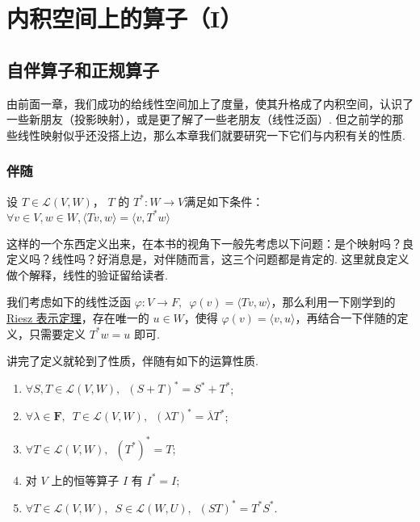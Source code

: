 \chapter{内积空间上的算子（I）}

\section{自伴算子和正规算子}

由前面一章，我们成功的给线性空间加上了度量，使其升格成了内积空间，认识了一些新朋友（投影映射），或是更了解了一些老朋友（线性泛函）. 但之前学的那些线性映射似乎还没搭上边，那么本章我们就要研究一下它们与内积有关的性质.

\subsection{伴随}

\begin{definition}[伴随]
    设 $ T \in \mathcal{L}(V, W) $， $ T $ 的 $ T^*: W \rightarrow V $满足如下条件： $ \forall v \in V, w \in W, \langle Tv, w \rangle = \langle v, T^*w \rangle$
\end{definition}

这样的一个东西定义出来，在本书的视角下一般先考虑以下问题：是个映射吗？良定义吗？线性吗？好消息是，对伴随而言，这三个问题都是肯定的. 这里就良定义做个解释，线性的验证留给读者.

我们考虑如下的线性泛函 $ \varphi : V \rightarrow F, \enspace \varphi (v) = \langle Tv, w \rangle $，那么利用一下刚学到的 \hyperref[thm:23:Riesz]{Riesz 表示定理}，存在唯一的 $ u \in W $，使得 $ \varphi (v) = \langle v, u \rangle $，再结合一下伴随的定义，只需要定义 $ T^*w = u $ 即可.

讲完了定义就轮到了性质，伴随有如下的运算性质.
\begin{enumerate}
    \item $ \forall S, T \in \mathcal{L}(V, W),\enspace (S + T)^* = S^* + T^* $;

    \item $ \forall \lambda \in \mathbf{F},\enspace T \in \mathcal{L}(V, W),\enspace (\lambda T)^* = \overline{\lambda} T^* $;

    \item $ \forall T \in \mathcal{L}(V, W),\enspace (T^*)^* = T $;

    \item 对 $ V $ 上的恒等算子 $ I $ 有 $ I^* = I $;

    \item $ \forall T \in \mathcal{L}(V, W),\enspace S \in \mathcal{L}(W, U),\enspace (ST)^* = T^*S^* $.
\end{enumerate}

